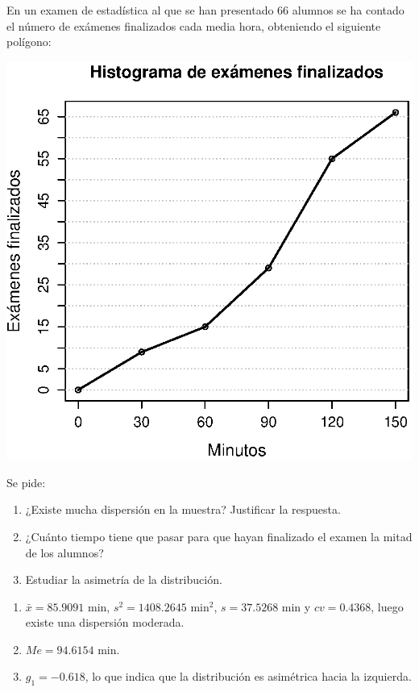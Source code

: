 {En un examen de estadística al que se han presentado 66 alumnos se ha contado el número de exámenes finalizados cada media hora, 
obteniendo el siguiente polígono:
\begin{center}
\includegraphics[scale=0.8]{img/poligono-des-56}
\end{center}
Se pide:
\begin{enumerate}
\item ¿Existe mucha dispersión en la muestra? Justificar la respuesta.
\item ¿Cuánto tiempo tiene que pasar para que hayan finalizado el examen la mitad de los alumnos?
\item Estudiar la asimetría de la distribución.  
\end{enumerate}
}
{\begin{enumerate}
\item $\bar x= 85.9091$ min, $s^2 =1408.2645$ min$^2$, $s= 37.5268$ min y $cv= 0.4368$, luego existe una dispersión moderada.
\item $Me = 94.6154$ min.
\item $g_1= -0.618$, lo que indica que la distribución es asimétrica hacia la izquierda. 
\end{enumerate}
}
